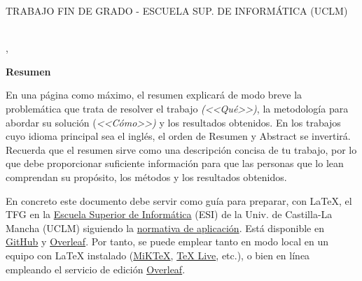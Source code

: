 \pagestyle{plain}	%

%
% 
%

\makeatletter
\begin{center} %
   {\textsc{TRABAJO FIN DE GRADO - ESCUELA SUP. DE INFORMÁTICA (UCLM)}\par} %
   \vspace{1cm} %
   {\textbf{\Large\@tituloCorto}\par}  %
   \vspace{0.4cm} %
   {\@autor \\ \@cityTF,{} \@mesTF{} \@yearTF\par} 
   \vspace{0.9cm} %
   {\textbf{\large\textsf{Resumen}}\par} %
\end{center}   
\makeatother %
En una página como máximo, el resumen explicará de modo breve la problemática que trata de resolver el trabajo \emph{(<<Qué>>)}, la metodología para  abordar su solución (\emph{<<Cómo>>)} y los resultados obtenidos. En los trabajos cuyo idioma principal sea el inglés, el orden de \textsf{Resumen} y \textsf{Abstract} se invertirá. Recuerda que el resumen sirve como una descripción concisa de tu trabajo, por lo que debe proporcionar suficiente información para que las personas que lo lean comprendan su propósito, los métodos y los resultados obtenidos.

En concreto este documento debe servir como guía para preparar, con LaTeX, el TFG en la \href{http://webpub.esi.uclm.es/}{Escuela Superior de Informática} (ESI) de la Univ. de Castilla-La Mancha (UCLM) siguiendo la \href{https://pruebasaluuclm.sharepoint.com/sites/esicr/tfg/SitePages/Inicio.aspx}{normativa de aplicación}. Está disponible en \href{https://github.com/JesusSalido/TFG_ESI_UCLM}{GitHub} y \href{https://www.overleaf.com/latex/templates/plantilla-de-tfg-escuela-superior-de-informatica-uclm/phjgscmfqtsw}{Overleaf}. Por tanto, se puede emplear tanto en modo local en un equipo con LaTeX instalado (\href{https://miktex.org/}{MiKTeX}, \href{https://www.tug.org/texlive/}{TeX Live}, etc.), o bien en línea empleando el servicio de edición \href{https://www.overleaf.com/latex/templates/plantilla-de-tfg-escuela-superior-de-informatica-uclm/phjgscmfqtsw}{Overleaf}.

